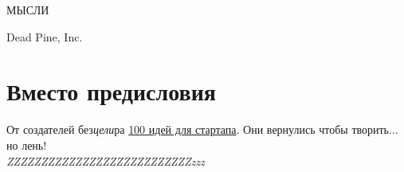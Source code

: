 \documentclass{ideas}
\renewcommand{\author}{Dead Pine, Inc.}
\newcommand{\anttf}[1]{\fontfamily{antt}\selectfont#1}
\begin{document}
\begin{titlepage}

\vspace*{\fill}
\begin{center}
\anttf{\Huge МЫСЛИ} 
\end{center}
\vspace*{\fill}
\begin{center}
\author\\\the\year
\end{center}
\end{titlepage}
\section*{Вместо предисловия}
\vspace*{\fill}
    От создателей без\emph{цели}ра \href{https://antoniii.github.io/}{100 идей для стартапа}.
    Они вернулись чтобы творить... но лень!\\

    \emph{\Huge{ZZZ}\LARGE{ZZZ}\Large{ZZZ}\large{ZZZ}ZZZ\small{ZZZ}\footnotesize{ZZZ}\scriptsize{ZZZ}\tiny{ZZZ}\tiny{zzz}}
\end{document}
